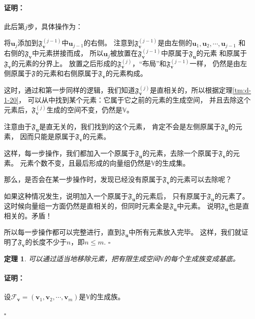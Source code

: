 \documentclass[12pt,UTF8]{ctexbook}
\renewenvironment{proof}{\paragraph{\textbf{证明：}}}{\hfill$\square$}
\newtheorem{tm}{定理}[section]
\begin{document}
\begin{appendix}
\begin{proof}
    此后第$j$步，具体操作为：

    将$\mathbf{u}_j$添加到$\mathfrak{F}_{\mathbf{v}}^{(j-1)}$中$\mathbf{u}_{j-1}$的右侧。
    注意到$\mathfrak{F}_{\mathbf{v}}^{(j-1)}$是由左侧的$\mathbf{u}_1, \mathbf{u}_2, \cdots , \mathbf{u}_{j-1}$
    和右侧的$\mathfrak{F}_{\mathbf{v}}$中元素拼接而成，
    所以$\mathbf{u}_j$被放置在$\mathfrak{F}_{\mathbf{v}}^{(j-1)}$中原属于$\mathfrak{F}_{\mathbf{u}}$的元素
    和原属于$\mathfrak{F}_{\mathbf{v}}$的元素的分界上。
    放置之后形成的$\mathfrak{F}_{\mathbf{v}}^{(j)}$，“布局”和$\mathfrak{F}_{\mathbf{v}}^{(j-1)}$一样，
    仍然是由左侧原属于$\mathfrak{F}_{\mathbf{}}$的元素和右侧原属于$\mathfrak{F}_{\mathbf{v}}$的元素构成。
    
    这时，通过和第一步同样的逻辑，我们知道$\mathfrak{F}_{\mathbf{v}}^{(j)}$是直相关的，所以根据定理\ref{tm:d-1-20}，
    可以从中找到某个元素：它属于它之前的元素的生成空间，
    并且去除这个元素后，$\mathfrak{F}_{\mathbf{v}}^{(j)}$生成的空间不变，仍然是$\mathbb{V}$。

    注意由于$\mathfrak{F}_{\mathbf{u}}$是直无关的，我们找到的这个元素，
    肯定不会是左侧原属于$\mathfrak{F}_{\mathbf{u}}$的元素，
    因而只能是原属于$\mathfrak{F}_{\mathbf{v}}$的元素。

    这样，每一步操作，我们都加入一个原属于$\mathfrak{F}_{\mathbf{u}}$的元素，去除一个原属于$\mathfrak{F}_{\mathbf{v}}$的元素。
    元素个数不变，且最后形成的向量组仍然是$\mathbb{V}$的生成集。

    那么，是否会在某一步操作时，发现已经没有原属于$\mathfrak{F}_{\mathbf{v}}$的元素可以去除呢？

    如果这种情况发生，说明加入一个原属于$\mathfrak{F}_{\mathbf{u}}$的元素后，
    只有原属于$\mathfrak{F}_{\mathbf{u}}$的元素了。
    这时候向量组一方面仍然是直相关的，但同时元素全是$\mathfrak{F}_{\mathbf{u}}$中元素。
    说明$\mathfrak{F}_{\mathbf{u}}$也是直相关的。矛盾！

    所以每一步操作都可以完整进行，直到$\mathfrak{F}_{\mathbf{u}}$中所有元素放入完毕。
    这样，我们就证明了$\mathfrak{F}_{\mathbf{v}}$的长度不少于$n$，即$n \leq m$.
\end{proof}

\begin{tm}\label{tm:d-1-40}
    可以通过适当地移除元素，把有限生成空间$\mathbb{V}$的每个生成族变成基底。
\end{tm}

\begin{proof}
    设$\mathcal{F}_{\mathbf{v}} = (\mathbf{v}_1, \mathbf{v}_2, \cdots , \mathbf{v}_m )$是$\mathbb{V}$的生成族。
    

\end{proof}
\end{appendix}
\end{document}
